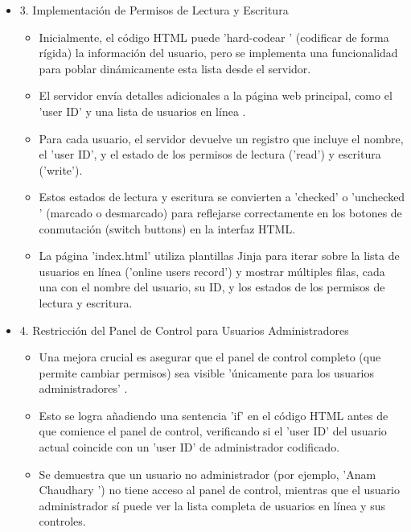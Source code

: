 \documentclass{report}
\begin{document}
\begin{itemize}
    \item 3. Implementación de Permisos de Lectura y Escritura
    \begin{itemize}
        \item Inicialmente, el código HTML puede  'hard-codear ' (codificar de forma rígida) la información del usuario, pero se implementa 
        una funcionalidad para  poblar dinámicamente esta lista  desde el servidor.
        \item El servidor envía detalles adicionales a la página web principal, como el 'user ID' y una  lista de usuarios en línea .
        \item Para cada usuario, el servidor devuelve un registro que incluye el nombre, el 'user ID', y el estado de los permisos de 
        lectura ('read') y escritura ('write').
        \item Estos estados de lectura y escritura se convierten a 'checked' o  'unchecked ' (marcado o desmarcado) para reflejarse 
        correctamente en los botones de conmutación (switch buttons) en la interfaz HTML.
        \item La página 'index.html' utiliza  plantillas Jinja  para iterar sobre la lista de usuarios en línea ('online users record') y 
        mostrar múltiples filas, cada una con el nombre del usuario, su ID, y los estados de los permisos de lectura y escritura.
    \end{itemize}

    \item 4. Restricción del Panel de Control para Usuarios Administradores
    \begin{itemize}
        \item Una mejora crucial es asegurar que el  panel de control completo (que permite cambiar permisos) sea visible  'únicamente para 
        los usuarios administradores' .
        \item Esto se logra añadiendo una  sentencia 'if' en el código HTML  antes de que comience el panel de control, verificando si el 'user ID' 
        del usuario actual coincide con un 'user ID' de administrador codificado.
        \item Se demuestra que un usuario no administrador (por ejemplo,  'Anam Chaudhary ') no tiene acceso al panel de control, mientras que el 
        usuario administrador sí puede ver la lista completa de usuarios en línea y sus controles.
    \end{itemize}


\end{itemize}
\end{document}
